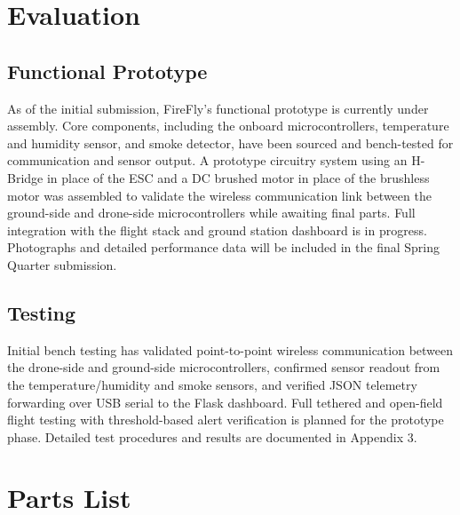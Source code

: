 \documentclass[journal, onecolumn]{IEEEtran}
\begin{document}
\newpage

\section{Evaluation}

\subsection{Functional Prototype}
As of the initial submission, FireFly's functional prototype is currently under assembly. Core components, including the onboard microcontrollers, temperature and humidity sensor, and smoke detector, have been sourced and bench-tested for communication and sensor output. A prototype circuitry system using an H-Bridge in place of the ESC and a DC brushed motor in place of the brushless motor was assembled to validate the wireless communication link between the ground-side and drone-side microcontrollers while awaiting final parts. Full integration with the flight stack and ground station dashboard is in progress. Photographs and detailed performance data will be included in the final Spring Quarter submission.

\subsection{Testing}
Initial bench testing has validated point-to-point wireless communication between the drone-side and ground-side microcontrollers, confirmed sensor readout from the temperature/humidity and smoke sensors, and verified JSON telemetry forwarding over USB serial to the Flask dashboard. Full tethered and open-field flight testing with threshold-based alert verification is planned for the prototype phase. Detailed test procedures and results are documented in Appendix 3.

\newpage

\section{Parts List}
\end{document}
